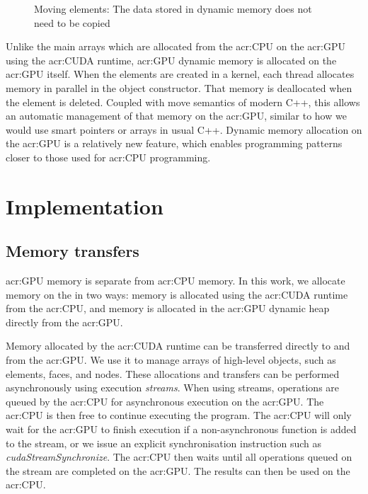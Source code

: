 \begin{figure}[H]
    \centering
    
    \caption{Moving elements: The data stored in dynamic memory does not need to be copied}\label{fig:moving_elements}
\end{figure}

Unlike the main arrays which are allocated from the \acrshort{acr:CPU} on the \acrshort{acr:GPU}
using the \acrshort{acr:CUDA} runtime, \acrshort{acr:GPU} dynamic memory is allocated on the
\acrshort{acr:GPU} itself. When the elements are created in a kernel, each thread allocates memory
in parallel in the object constructor. That memory is deallocated when the element is deleted.
Coupled with move semantics of modern C++, this allows an automatic management of that memory on the
\acrshort{acr:GPU}, similar to how we would use smart pointers or arrays in usual C++. Dynamic
memory allocation on the \acrshort{acr:GPU} is a relatively new feature, which enables programming
patterns closer to those used for \acrshort{acr:CPU} programming.

\section{Implementation}\label{section:graphics_processing_units:implementation}

\subsection{Memory transfers}\label{subsection:graphics_processing_units:implementation:memory}

\Acrshort{acr:GPU} memory is separate from \acrshort{acr:CPU} memory. In this work, we allocate
memory on the  in two ways: memory is allocated using the \acrshort{acr:CUDA}
runtime from the \acrshort{acr:CPU}, and memory is allocated in the \acrshort{acr:GPU} dynamic heap
directly from the \acrshort{acr:GPU}.

Memory allocated by the \acrshort{acr:CUDA} runtime can be transferred directly to and from the
\acrshort{acr:GPU}. We use it to manage arrays of high-level objects, such as elements, faces, and
nodes. These allocations and transfers can be performed asynchronously using execution
\textit{streams}. When using streams, operations are queued by the \acrshort{acr:CPU} for
asynchronous execution on the \acrshort{acr:GPU}. The \acrshort{acr:CPU} is then free to continue
executing the program. The \acrshort{acr:CPU} will only wait for the \acrshort{acr:GPU} to finish
execution if a non-asynchronous function is added to the stream, or we issue an explicit
synchronisation instruction such as \textit{cudaStreamSynchronize}. The \acrshort{acr:CPU} then
waits until all operations queued on the stream are completed on the \acrshort{acr:GPU}. The results
can then be used on the \acrshort{acr:CPU}.

